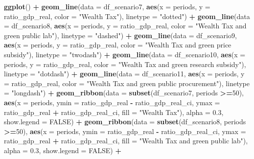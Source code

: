 \documentclass[
]{article}
\newenvironment{Shaded}{\begin{snugshade}}{\end{snugshade}}
\newcommand{\AttributeTok}[1]{\textcolor[rgb]{0.13,0.29,0.53}{#1}}
\newcommand{\ConstantTok}[1]{\textcolor[rgb]{0.56,0.35,0.01}{#1}}
\newcommand{\DecValTok}[1]{\textcolor[rgb]{0.00,0.00,0.81}{#1}}
\newcommand{\FloatTok}[1]{\textcolor[rgb]{0.00,0.00,0.81}{#1}}
\newcommand{\FunctionTok}[1]{\textcolor[rgb]{0.13,0.29,0.53}{\textbf{#1}}}
\newcommand{\NormalTok}[1]{#1}
\newcommand{\SpecialCharTok}[1]{\textcolor[rgb]{0.81,0.36,0.00}{\textbf{#1}}}
\newcommand{\StringTok}[1]{\textcolor[rgb]{0.31,0.60,0.02}{#1}}
\begin{document}
\begin{Shaded}
\begin{Highlighting}[]
\FunctionTok{ggplot}\NormalTok{() }\SpecialCharTok{+}
  \FunctionTok{geom\_line}\NormalTok{(}\AttributeTok{data =}\NormalTok{ df\_scenario7, }\FunctionTok{aes}\NormalTok{(}\AttributeTok{x =}\NormalTok{ periods, }\AttributeTok{y =}\NormalTok{ ratio\_gdp\_real, }\AttributeTok{color =} \StringTok{"Wealth Tax"}\NormalTok{), }\AttributeTok{linetype =} \StringTok{"dotted"}\NormalTok{) }\SpecialCharTok{+}
  \FunctionTok{geom\_line}\NormalTok{(}\AttributeTok{data =}\NormalTok{ df\_scenario8, }\FunctionTok{aes}\NormalTok{(}\AttributeTok{x =}\NormalTok{ periods, }\AttributeTok{y =}\NormalTok{ ratio\_gdp\_real, }\AttributeTok{color =} \StringTok{"Wealth Tax and green public lab"}\NormalTok{), }\AttributeTok{linetype =} \StringTok{"dashed"}\NormalTok{) }\SpecialCharTok{+}
  \FunctionTok{geom\_line}\NormalTok{(}\AttributeTok{data =}\NormalTok{ df\_scenario9, }\FunctionTok{aes}\NormalTok{(}\AttributeTok{x =}\NormalTok{ periods, }\AttributeTok{y =}\NormalTok{ ratio\_gdp\_real, }\AttributeTok{color =} \StringTok{"Wealth Tax and green price subsidy"}\NormalTok{), }\AttributeTok{linetype =} \StringTok{"twodash"}\NormalTok{) }\SpecialCharTok{+}
  \FunctionTok{geom\_line}\NormalTok{(}\AttributeTok{data =}\NormalTok{ df\_scenario10, }\FunctionTok{aes}\NormalTok{(}\AttributeTok{x =}\NormalTok{ periods, }\AttributeTok{y =}\NormalTok{ ratio\_gdp\_real, }\AttributeTok{color =} \StringTok{"Wealth Tax and green research subsidy"}\NormalTok{), }\AttributeTok{linetype =} \StringTok{"dotdash"}\NormalTok{) }\SpecialCharTok{+}
  \FunctionTok{geom\_line}\NormalTok{(}\AttributeTok{data =}\NormalTok{ df\_scenario11, }\FunctionTok{aes}\NormalTok{(}\AttributeTok{x =}\NormalTok{ periods, }\AttributeTok{y =}\NormalTok{ ratio\_gdp\_real, }\AttributeTok{color =} \StringTok{"Wealth Tax and green public procurement"}\NormalTok{), }\AttributeTok{linetype =} \StringTok{"longdash"}\NormalTok{) }\SpecialCharTok{+}
  \FunctionTok{geom\_ribbon}\NormalTok{(}\AttributeTok{data =} \FunctionTok{subset}\NormalTok{(df\_scenario7, periods }\SpecialCharTok{\textgreater{}=}\DecValTok{50}\NormalTok{), }\FunctionTok{aes}\NormalTok{(}\AttributeTok{x =}\NormalTok{ periods, }\AttributeTok{ymin =}\NormalTok{ ratio\_gdp\_real }\SpecialCharTok{{-}}\NormalTok{ ratio\_gdp\_real\_ci, }\AttributeTok{ymax =}\NormalTok{ ratio\_gdp\_real }\SpecialCharTok{+}\NormalTok{ ratio\_gdp\_real\_ci, }\AttributeTok{fill =} \StringTok{"Wealth Tax"}\NormalTok{), }\AttributeTok{alpha =} \FloatTok{0.3}\NormalTok{, }\AttributeTok{show.legend =} \ConstantTok{FALSE}\NormalTok{) }\SpecialCharTok{+}
  \FunctionTok{geom\_ribbon}\NormalTok{(}\AttributeTok{data =} \FunctionTok{subset}\NormalTok{(df\_scenario8, periods }\SpecialCharTok{\textgreater{}=}\DecValTok{50}\NormalTok{), }\FunctionTok{aes}\NormalTok{(}\AttributeTok{x =}\NormalTok{ periods, }\AttributeTok{ymin =}\NormalTok{ ratio\_gdp\_real }\SpecialCharTok{{-}}\NormalTok{ ratio\_gdp\_real\_ci, }\AttributeTok{ymax =}\NormalTok{ ratio\_gdp\_real }\SpecialCharTok{+}\NormalTok{ ratio\_gdp\_real\_ci, }\AttributeTok{fill =} \StringTok{"Wealth Tax and green public lab"}\NormalTok{), }\AttributeTok{alpha =} \FloatTok{0.3}\NormalTok{, }\AttributeTok{show.legend =} \ConstantTok{FALSE}\NormalTok{) }\SpecialCharTok{+}

\end{Highlighting}
\end{Shaded}
\end{document}
